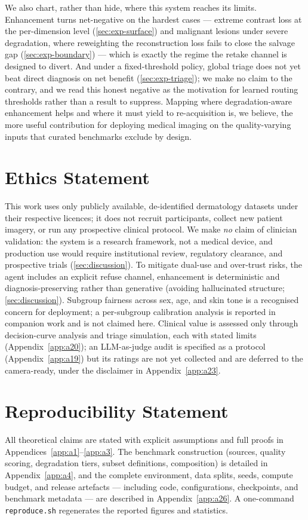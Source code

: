 \documentclass{article}
\begin{document}
We also chart, rather than hide, where this system reaches its limits. Enhancement turns net-negative
on the hardest cases --- extreme contrast loss at the per-dimension level
(\cref{sec:exp-surface}) and malignant lesions under severe degradation, where reweighting the
reconstruction loss fails to close the salvage gap (\cref{sec:exp-boundary}) --- which is exactly
the regime the retake channel is designed to divert. And under a fixed-threshold policy, global
triage does not yet beat direct diagnosis on net benefit (\cref{sec:exp-triage}); we make no claim
to the contrary, and we read this honest negative as the motivation for learned routing thresholds
rather than a result to suppress. Mapping where degradation-aware enhancement helps and where it
must yield to re-acquisition is, we believe, the more useful contribution for deploying
medical imaging on the quality-varying inputs that curated benchmarks exclude by design.

\section*{Ethics Statement}\label{sec:ethics}
This work uses only publicly available, de-identified dermatology datasets under their respective
licences; it does not recruit participants, collect new patient imagery, or run any prospective
clinical protocol. We make \emph{no} claim of clinician validation: the system is a research
framework, not a medical device, and production use would require institutional review, regulatory
clearance, and prospective trials (\cref{sec:discussion}). To mitigate dual-use and over-trust risks,
the agent includes an explicit refuse channel, enhancement is deterministic and diagnosis-preserving
rather than generative (avoiding hallucinated structure; \cref{sec:discussion}). Subgroup fairness
across sex, age, and skin tone is a recognised concern for deployment; a per-subgroup calibration
analysis is reported in companion work and is not claimed here. Clinical value is assessed only
through decision-curve analysis and triage simulation, each with
stated limits (Appendix~\ref{app:a20}); an LLM-as-judge audit is specified as a protocol
(Appendix~\ref{app:a19}) but its ratings are not yet collected and are deferred to the
camera-ready, under the disclaimer in Appendix~\ref{app:a23}.

\section*{Reproducibility Statement}\label{sec:repro}
All theoretical claims are stated with explicit assumptions and full proofs in
Appendices~\ref{app:a1}--\ref{app:a3}. The benchmark construction (sources, quality scoring,
degradation tiers, subset definitions, composition) is detailed in Appendix~\ref{app:a4}, and the
complete environment, data splits, seeds, compute budget, and release artefacts --- including code,
configurations, checkpoints, and benchmark metadata --- are described in Appendix~\ref{app:a26}. A
one-command \texttt{reproduce.sh} regenerates the reported figures and statistics.
\end{document}
